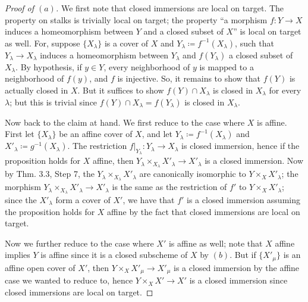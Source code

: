 \documentclass[10pt]{article}
\theoremstyle{definition}
\theoremstyle{remark}
\numberwithin{equation}{section}
\numberwithin{figure}{subsubsection}
\begin{document}
\begin{proof}[Proof of $(a)$]
  We first note that closed immersions are local on target. The property on
  stalks is trivially local on target; the property ``a morphism $f\colon Y \to
  X$ induces a homeomorphism between $Y$ and a closed subset of $X$'' is local
  on target as well. For, suppose $\{X_\lambda\}$ is a cover of $X$ and
  $Y_\lambda \coloneqq f^{-1}(X_\lambda)$, such that $Y_\lambda \to X_\lambda$ induces a homeomorphism between $Y_\lambda$ and $f(Y_\lambda)$ a closed subset of $X_\lambda$. By hypothesis, if $y \in Y$, every neighborhood of $y$ is mapped to a neighborhood of $f(y)$, and $f$ is injective. So, it remains to show that $f(Y)$ is actually closed in $X$. But it suffices to show $f(Y) \cap X_\lambda$ is closed in $X_\lambda$ for every $\lambda$; but this is trivial since $f(Y) \cap X_\lambda = f(Y_\lambda)$ is closed in $X_\lambda$.
  \par Now back to the claim at hand. We first reduce to the case where $X$ is
  affine. First let $\{X_\lambda\}$ be an affine cover of $X$, and let
  $Y_\lambda \coloneqq f^{-1}(X_\lambda)$ and $X'_\lambda \coloneqq g^{-1}(X_\lambda)$. The restriction $f\rvert_{Y_\lambda}\colon Y_\lambda \to X_\lambda$ is closed immersion, hence if the proposition holds for $X$ affine, then $Y_\lambda \times_{X_\lambda} X'_\lambda \to X'_\lambda$ is a closed immersion. Now by Thm. 3.3, Step 7, the $Y_\lambda \times_{X_\lambda} X'_\lambda$ are canonically isomorphic to $Y \times_X X'_\lambda$; the morphism $Y_\lambda \times_{X_\lambda} X'_\lambda \to X'_\lambda$ is the same as the restriction of $f'$ to $Y \times_X X'_\lambda$; since the $X'_\lambda$ form a cover of $X'$, we have that $f'$ is a closed immersion assuming the proposition holds for $X$ affine by the fact that closed immersions are local on target.
  \par Now we further reduce to the case where $X'$ is affine as well; note that
  $X$ affine implies $Y$ is affine since it is a closed subscheme of $X$ by
  $(b)$. But if $\{X'_\mu\}$ is an affine open cover of $X'$, then $Y \times_X X'_\mu \to X'_\mu$ is a closed immersion by the affine case we wanted to reduce to, hence $Y \times_X X' \to X'$ is a closed immersion since closed immersions are local on target.
\end{proof}
\end{document}
